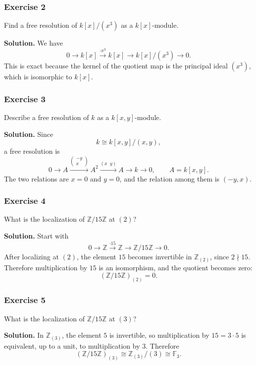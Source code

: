 \documentclass[12pt,a4paper]{article}
\theoremstyle{notespace}
\theoremstyle{definition}
\begin{document}
\subsubsection*{Exercise 2}
Find a free resolution of \(k[x]/(x^3)\) as a \(k[x]\)-module.

\textbf{Solution.}
We have
\[
0 \longrightarrow k[x] \xrightarrow{\cdot x^3} k[x] \longrightarrow k[x]/(x^3) \longrightarrow 0.
\]
This is exact because the kernel of the quotient map is the principal ideal \((x^3)\), which is isomorphic to \(k[x]\).

\subsubsection*{Exercise 3}
Describe a free resolution of \(k\) as a \(k[x,y]\)-module.

\textbf{Solution.}
Since
\[
k \cong k[x,y]/(x,y),
\]
a free resolution is
\[
0 \longrightarrow A \xrightarrow{\begin{pmatrix}-y\\x\end{pmatrix}} A^2
\xrightarrow{(x\;\;y)} A \longrightarrow k \longrightarrow 0,
\qquad A=k[x,y].
\]
The two relations are \(x=0\) and \(y=0\), and the relation among them is \((-y,x)\).

\subsubsection*{Exercise 4}
What is the localization of \(\mathbb Z/15\mathbb Z\) at \((2)\)?

\textbf{Solution.}
Start with
\[
0 \longrightarrow \mathbb Z \xrightarrow{\cdot 15} \mathbb Z \longrightarrow \mathbb Z/15\mathbb Z \longrightarrow 0.
\]
After localizing at \((2)\), the element \(15\) becomes invertible in \(\mathbb Z_{(2)}\), since \(2\nmid 15\).
Therefore multiplication by \(15\) is an isomorphism, and the quotient becomes zero:
\[
(\mathbb Z/15\mathbb Z)_{(2)}=0.
\]

\subsubsection*{Exercise 5}
What is the localization of \(\mathbb Z/15\mathbb Z\) at \((3)\)?

\textbf{Solution.}
In \(\mathbb Z_{(3)}\), the element \(5\) is invertible, so multiplication by \(15=3\cdot 5\) is equivalent, up to a unit, to multiplication by \(3\). Therefore
\[
(\mathbb Z/15\mathbb Z)_{(3)} \cong \mathbb Z_{(3)}/(3)\cong \mathbb F_3.
\]
\end{document}
